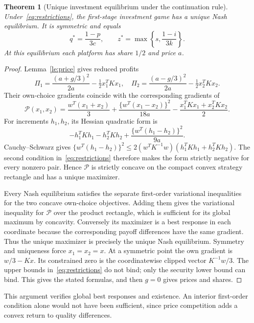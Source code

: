 \documentclass[11pt,a4paper]{article}
\newtheorem{theorem}{Theorem}[section]
\theoremstyle{definition}
\theoremstyle{remark}
\begin{document}
\begin{theorem}[Unique investment equilibrium under the continuation rule]\label{th:investment}
Under~\eqref{eq:restrictions}, the first-stage investment game has a unique Nash equilibrium. It is symmetric and equals
\[
 q^*=\frac{1-p}{3c},\qquad
 z^*=\max\left\{s,\frac{1-i}{3k}\right\}.
\]
At this equilibrium each platform has share $1/2$ and price $a$.
\end{theorem}
\begin{proof}
Lemma~\ref{le:price} gives reduced profits
\[
 \Pi_1=\frac{(a+g/3)^2}{2a}-\tfrac12x_1^TKx_1,
 \quad
 \Pi_2=\frac{(a-g/3)^2}{2a}-\tfrac12x_2^TKx_2.
\]
Their own-choice gradients coincide with the corresponding gradients of
\[
 \mathcal P(x_1,x_2)=\frac{w^T(x_1+x_2)}3
       +\frac{\{w^T(x_1-x_2)\}^2}{18a}
       -\frac{x_1^TKx_1+x_2^TKx_2}{2}.
\]
For increments $h_1,h_2$, its Hessian quadratic form is
\[
 -h_1^TKh_1-h_2^TKh_2
       +\frac{\{w^T(h_1-h_2)\}^2}{9a}.
\]
Cauchy--Schwarz gives
$\{w^T(h_1-h_2)\}^2\leq2(w^TK^{-1}w)
(h_1^TKh_1+h_2^TKh_2)$.
The second condition in~\eqref{eq:restrictions} therefore makes the form strictly negative for every nonzero pair. Hence $\mathcal P$ is strictly concave on the compact convex strategy rectangle and has a unique maximizer.

Every Nash equilibrium satisfies the separate first-order variational inequalities for the two concave own-choice objectives. Adding them gives the variational inequality for $\mathcal P$ over the product rectangle, which is sufficient for its global maximum by concavity. Conversely its maximizer is a best response in each coordinate because the corresponding payoff differences have the same gradient. Thus the unique maximizer is precisely the unique Nash equilibrium. Symmetry and uniqueness force $x_1=x_2=x$. At a symmetric point the own gradient is $w/3-Kx$. Its constrained zero is the coordinatewise clipped vector $K^{-1}w/3$. The upper bounds in~\eqref{eq:restrictions} do not bind; only the security lower bound can bind. This gives the stated formulas, and then $g=0$ gives prices and shares.
\end{proof}

This argument verifies global best responses and existence. An interior first-order condition alone would not have been sufficient, since price competition adds a convex return to quality differences.
\end{document}
